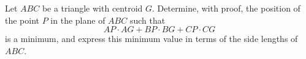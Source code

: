 Let $ABC$ be a triangle with centroid $G$. Determine, with proof, the position of the point $P$ in the plane of $ABC$ such that
\[ AP \cdot AG + BP \cdot BG + CP \cdot CG \]
is a minimum, and express this minimum value in terms of the side lengths of $ABC$.
